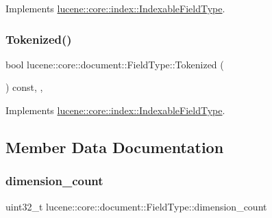 Implements \mbox{\hyperlink{classlucene_1_1core_1_1index_1_1IndexableFieldType_a21794361c1b7739d8cb8e11a39e23970}{lucene\+::core\+::index\+::\+Indexable\+Field\+Type}}.

\mbox{\label{classlucene_1_1core_1_1document_1_1FieldType_ad46702a08ecdf7c0138bc950865f074c}} 
\subsubsection{\texorpdfstring{Tokenized()}{Tokenized()}}
{\footnotesize\ttfamily bool lucene\+::core\+::document\+::\+Field\+Type\+::\+Tokenized (\begin{DoxyParamCaption}{ }\end{DoxyParamCaption}) const\hspace{0.3cm}{\ttfamily [inline]}, {\ttfamily [virtual]}, {\ttfamily [noexcept]}}



Implements \mbox{\hyperlink{classlucene_1_1core_1_1index_1_1IndexableFieldType_a107c742e5d273bbf4d1b36da7509c9ad}{lucene\+::core\+::index\+::\+Indexable\+Field\+Type}}.



\subsection{Member Data Documentation}
\mbox{\label{classlucene_1_1core_1_1document_1_1FieldType_a86df8398e9e9765cda2d2e48c2ec8cce}} 
\subsubsection{\texorpdfstring{dimension\+\_\+count}{dimension\_count}}
{\footnotesize\ttfamily uint32\+\_\+t lucene\+::core\+::document\+::\+Field\+Type\+::dimension\+\_\+count\hspace{0.3cm}{\ttfamily [private]}}

